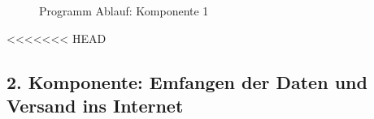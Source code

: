 \begin{center}
	\begin{figure}[h]
	 
	 \noindent{}
	 \caption[PAP komponente 1]{Programm Ablauf: Komponente 1}
	 \label{fig:zeitplanung}
	\end{figure}
\end{center}

<<<<<<< HEAD
\subsection{2. Komponente: Emfangen der Daten und Versand ins Internet} \label{Empfänger}

